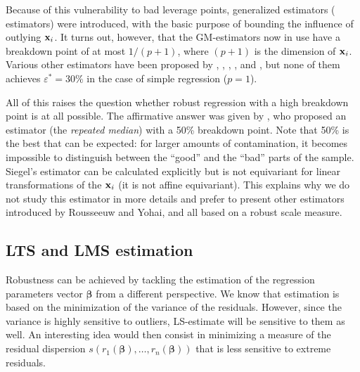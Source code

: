Because of this vulnerability to bad leverage points, generalized 
estimators ( estimators) were introduced, with the basic purpose of
bounding the influence of outlying $\mathbf x_{i}$. It turns out, however, that
the GM-estimators now in use have a breakdown point of at most $1/(p+1)$, where
$(p+1)$ is the dimension of $\mathbf x_{i}$. Various other estimators have been
proposed by \citet{Theil:1950}, \citet{Brown:1951}, \citet{Sen:1968},
\citet{Jaeckel:1972}, and \citet{Andrews:1974}, but none of them achieves
$\varepsilon^*=30\%$ in the case of simple regression ($p=1$).

All of this raises the question whether robust regression with a high breakdown
point is at all possible. The affirmative answer was given by
\citet{Siegel:1982}, who proposed an estimator (the \emph{repeated median})
with a 50\% breakdown point. Note that 50\% is the best that can be expected:
for larger amounts of contamination, it becomes impossible to distinguish
between the “good” and the “bad” parts of the sample. Siegel's estimator can be
calculated explicitly but is not equivariant for linear transformations of the
$\mathbf x_{i}$ (it is not affine equivariant). This explains why we do not
study this estimator in more details and prefer to present other estimators
introduced by Rousseeuw and Yohai, and all based on a robust scale measure.

\subsection{LTS and LMS estimation}

Robustness can be achieved by tackling the estimation of the regression
parameters vector $\boldsymbol\beta$ from a different perspective. We know that
 estimation is based on the minimization of the variance of the
residuals. However, since the variance is highly sensitive to outliers,
LS-estimate will be sensitive to them as well. An interesting idea would then
consist in minimizing a measure of the residual dispersion
$s(r_{1}(\boldsymbol\beta), \dots, r_{n}(\boldsymbol\beta))$ that is less
sensitive to extreme residuals.

